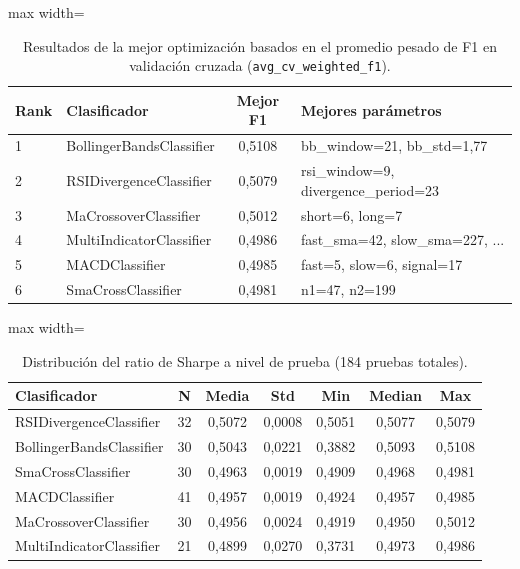 \vspace{1em}

\begin{table}[H]
    \centering
    \caption[Resultados de Optimización]{Resultados de la mejor optimización basados en el promedio pesado de F1 en validación cruzada (\texttt{avg\_cv\_weighted\_f1}).}
    \small
    \begin{adjustbox}{max width=\textwidth}
    \begin{tabular}{l l c p{5.5cm}}
        \toprule
        \textbf{Rank} & \textbf{Clasificador} & \textbf{Mejor F1} & \textbf{Mejores parámetros} \\
        \midrule
        1 & BollingerBandsClassifier & 0,5108 & bb\_window=21, bb\_std=1,77 \\
        2 & RSIDivergenceClassifier  & 0,5079 & rsi\_window=9, divergence\_period=23 \\
        3 & MaCrossoverClassifier    & 0,5012 & short=6, long=7 \\
        4 & MultiIndicatorClassifier & 0,4986 & fast\_sma=42, slow\_sma=227, ... \\
        5 & MACDClassifier           & 0,4985 & fast=5, slow=6, signal=17 \\
        6 & SmaCrossClassifier       & 0,4981 & n1=47, n2=199 \\
        \bottomrule
    \end{tabular}
    \end{adjustbox}
    \label{tab:optimizacion_f1}
\end{table}

\begin{table}[H]
    \centering
    \caption[Distribución de Sharpe]{Distribución del ratio de Sharpe a nivel de prueba (184 pruebas totales).}
    \small
    \begin{adjustbox}{max width=\textwidth}
    \begin{tabular}{l c c c c c c}
        \toprule
        \textbf{Clasificador} & \textbf{N} & \textbf{Media} & \textbf{Std} & \textbf{Min} & \textbf{Median} & \textbf{Max} \\
        \midrule
        RSIDivergenceClassifier  & 32 & 0,5072 & 0,0008 & 0,5051 & 0,5077 & 0,5079 \\
        BollingerBandsClassifier & 30 & 0,5043 & 0,0221 & 0,3882 & 0,5093 & 0,5108 \\
        SmaCrossClassifier       & 30 & 0,4963 & 0,0019 & 0,4909 & 0,4968 & 0,4981 \\
        MACDClassifier           & 41 & 0,4957 & 0,0019 & 0,4924 & 0,4957 & 0,4985 \\
        MaCrossoverClassifier    & 30 & 0,4956 & 0,0024 & 0,4919 & 0,4950 & 0,5012 \\
        MultiIndicatorClassifier & 21 & 0,4899 & 0,0270 & 0,3731 & 0,4973 & 0,4986 \\
        \bottomrule
    \end{tabular}
    \end{adjustbox}
    \label{tab:sharpe_dist}
\end{table}

